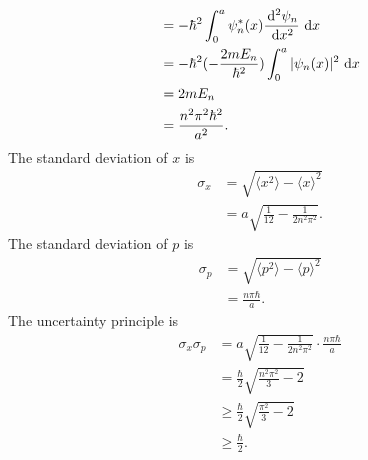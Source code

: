 \documentclass[en, oneside]{vivi}
\begin{document}
\begin{sol}
\begin{align*}
        &= -\hbar^2 \int_{0}^{a} \psi_n^*(x) \frac{\dif^2 \psi_n}{\dif x^2} \dif x\\
        &= -\hbar^2 (-\frac{2 m E_n}{\hbar^2}) \int_{0}^{a} |\psi_n(x)|^2 \dif x\\
        &= 2 m E_n\\
        &= \frac{n^2 \pi^2 \hbar^2}{a^2}.
    \end{align*}
    The standard deviation of $x$ is
    \begin{align*}
        \sigma_x &= \sqrt{\langle x^2 \rangle - \langle x \rangle^2}\\
        &= a \sqrt{\frac{1}{12} - \frac{1}{2 n^2 \pi^2}}.
    \end{align*}
    The standard deviation of $p$ is
    \begin{align*}
        \sigma_p &= \sqrt{\langle p^2 \rangle - \langle p \rangle^2}\\
        &= \frac{n \pi \hbar}{a}.
    \end{align*}
    The uncertainty principle is
    \begin{align*}
        \sigma_x \sigma_p &= a \sqrt{\frac{1}{12} - \frac{1}{2 n^2 \pi^2}} \cdot \frac{n \pi \hbar}{a}\\
        &= \frac{\hbar}{2} \sqrt{\frac{n^2 \pi^2}{3} - 2}\\
        &\geq \frac{\hbar}{2} \sqrt{\frac{\pi^2}{3} - 2}\\
        &\geq \frac{\hbar}{2}.
    \end{align*}
\end{sol}
\end{document}
